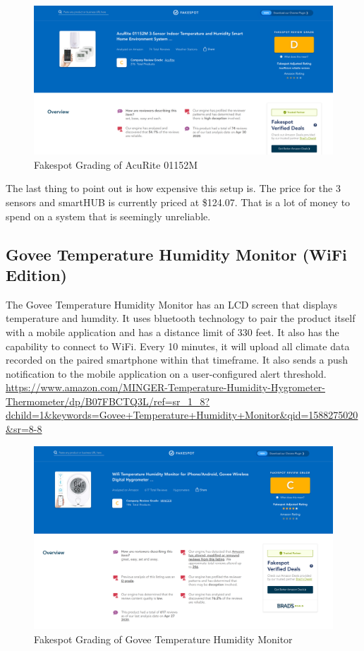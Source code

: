 \documentclass{article}
\begin{document}
\begin{figure}[H]
	\center
	\includegraphics[width=\textwidth]{images/acurite-fakespot.png}
	\caption{Fakespot Grading of AcuRite 01152M}
	\label{fig:acurite}
\end{figure}

The last thing to point out is how expensive this setup is. The price for the 3 sensors and smartHUB is currently priced at \$124.07. That is a lot of money to spend on a system that is seemingly unreliable.

\subsection{Govee Temperature Humidity Monitor (WiFi Edition)}
The Govee Temperature Humidity Monitor has an LCD screen that displays temperature and humdity. It uses bluetooth technology to pair the product itself with a mobile application and has a distance limit of 330 feet. It also has the capability to connect to WiFi. Every 10 minutes, it will upload all climate data recorded on the paired smartphone within that timeframe. It also sends a push notification to the mobile application on a user-configured alert threshold.\\

\url{https://www.amazon.com/MINGER-Temperature-Humidity-Hygrometer-Thermometer/dp/B07FBCTQ3L/ref=sr_1_8?dchild=1&keywords=Govee+Temperature+Humidity+Monitor&qid=1588275020&sr=8-8}\\

\begin{figure}[H]
	\center
	\includegraphics[width=\textwidth]{images/govee-fakespot.png}
	\caption{Fakespot Grading of Govee Temperature Humidity Monitor}
	\label{fig:govee}
\end{figure}
\end{document}
